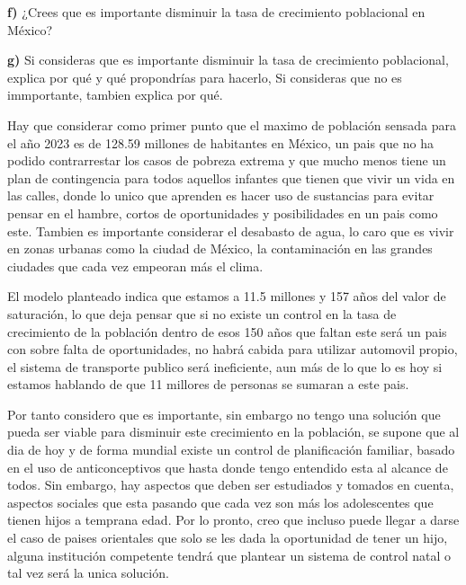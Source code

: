 \documentclass{article}
\begin{document}
\textbf{f)} ¿Crees que es importante disminuir la tasa de crecimiento poblacional en México?

\vspace{10pt}

\textbf{g)} Si consideras que es importante disminuir la tasa de crecimiento poblacional, explica por qué y qué propondrías para hacerlo, Si consideras que no es immportante, tambien explica por qué.

\vspace{10pt}

Hay que considerar como primer punto que el maximo de población sensada para el año 2023 es de 128.59 millones de habitantes en México, un pais que no ha podido contrarrestar los casos de pobreza extrema y que mucho menos tiene un plan de contingencia para todos aquellos infantes que tienen que vivir un vida en las calles, donde lo unico que aprenden es hacer uso de sustancias para evitar pensar en el hambre, cortos de oportunidades y posibilidades en un pais como este. Tambien es importante considerar el desabasto de agua, lo caro que es vivir en zonas urbanas como la ciudad de México, la contaminación en las grandes ciudades que cada vez empeoran más el clima. 

\vspace{10pt}

El modelo planteado indica que estamos a 11.5 millones y 157 años del valor de saturación, lo que deja pensar que si no existe un control en la tasa de crecimiento de la población dentro de esos 150 años que faltan este será un pais con sobre falta de oportunidades, no habrá cabida para utilizar automovil propio, el sistema de transporte publico será ineficiente, aun más de lo que lo es hoy si estamos hablando de que 11 millores de personas se sumaran a este pais. 

\vspace{10pt}

Por tanto considero que es importante, sin embargo no tengo una solución que pueda ser viable para disminuir este crecimiento en la población, se supone que al dia de hoy y de forma mundial existe un control de planificación familiar, basado en el uso de anticonceptivos que hasta donde tengo entendido esta al alcance de todos. Sin embargo, hay aspectos que deben ser estudiados y tomados en cuenta, aspectos sociales que esta pasando que cada vez son más los adolescentes que tienen hijos a temprana edad. Por lo pronto, creo que incluso puede llegar a darse el caso de paises orientales que solo se les dada la oportunidad de tener un hijo, alguna institución competente tendrá que plantear un sistema de control natal o tal vez será la unica solución.
\end{document}
